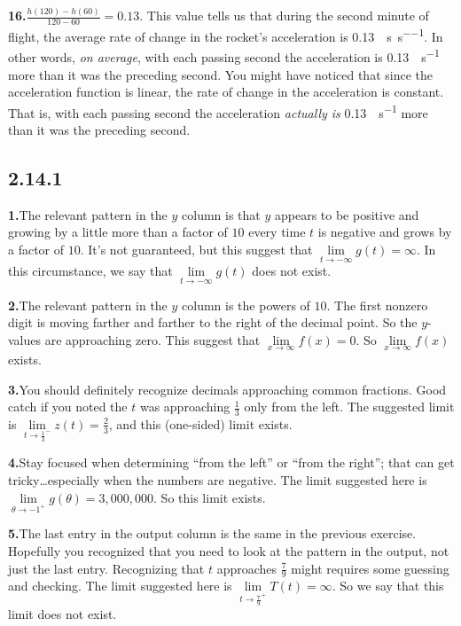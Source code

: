 \documentclass[10pt,oneside,]{book}
\theoremstyle{plain}
\theoremstyle{definition}
\numberwithin{equation}{section}
\newcommand{\fe}[2]{#1\mathopen{}\left(#2\right)\mathclose{}}
\begin{document}
\par\smallskip
\noindent\textbf{16.}\quad{}\(\frac{\fe{h}{120}-\fe{h}{60}}{120-60}=0.13\). This value tells us that during the second minute of flight, the average rate of change in the rocket's acceleration is \SI{0.13}{\mileperhour\per\second\per\second}.  In other words, \emph{on average}, with each passing second the acceleration  is \SI{0.13}{\mileperhour\per\second} more than it was the preceding second.  You might have noticed that since the acceleration function is linear, the rate of change in the acceleration is constant.  That is, with each passing second the acceleration \emph{actually is} \SI{0.13}{\mileperhour\per\second} more than it was the preceding second.%
\par\smallskip
\subsection*{2.14.1 }
\noindent\textbf{1.}\quad{}The relevant pattern in the \(y\) column is that \(y\) appears to be positive and growing by a little more than a factor of \(10\) every time \(t\) is negative and grows by a factor of \(10\). It's not guaranteed, but this suggest that \(\lim\limits_{t\to-\infty}\fe{g}{t}=\infty\). In this circumstance, we say that \(\lim\limits_{t\to-\infty}\fe{g}{t}\) does not exist.%
\par\smallskip
\noindent\textbf{2.}\quad{}The relevant pattern in the \(y\) column is the powers of \(10\).  The first nonzero digit is moving farther and farther to the right of the decimal point. So the \(y\)-values are approaching zero. This suggest that \(\lim\limits_{x\to\infty}\fe{f}{x}=0\). So \(\lim\limits_{x\to\infty}\fe{f}{x}\) exists.%
\par\smallskip
\noindent\textbf{3.}\quad{}You should definitely recognize decimals approaching common fractions.  Good catch if you noted the \(t\) was approaching \(\frac{1}{3}\) only from the left. The suggested limit is \(\lim\limits_{t\to\frac{1}{3}^{-}}\fe{z}{t}=\frac{2}{3}\), and this (one-sided) limit exists.%
\par\smallskip
\noindent\textbf{4.}\quad{}Stay focused when determining ``from the left'' or ``from the right''; that can get tricky\dots{}especially when the numbers are negative.  The limit suggested here is \(\lim\limits_{\theta\to-1^{+}}\fe{g}{\theta}=3{,}000{,}000\). So this limit exists.%
\par\smallskip
\noindent\textbf{5.}\quad{}The last entry in the output column is the same in the previous exercise.  Hopefully you recognized that you need to look at the pattern in the output, not just the last entry.  Recognizing that \(t\) approaches \(\frac{7}{9}\) might requires some guessing and checking. The limit suggested here is \(\lim\limits_{t\to\frac{7}{9}^{+}}\fe{T}{t}=\infty\). So we say that this limit does not exist.%
\end{document}
